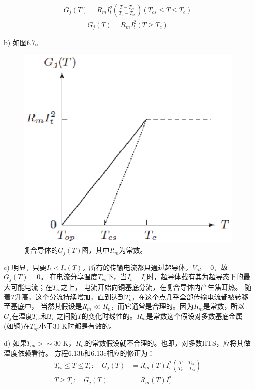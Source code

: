 \begin{align*}
	G_j(T)=R_mI_t^2(\frac{T-T_{cs}}{T_c-T_{cs}}) (T_{cs}\leq T\leq T_c) \tag{6.13b}
\end{align*}
\begin{align*}
    G_j(T)=R_mI_t^2 (T\ge T_c) \tag{6.13c}
\end{align*}


b) 如图6.7。
\begin{figure}[htbp]
	\centering
	\includegraphics[scale=0.6]{chpt6/figs/fig6.7.eps}
	\caption{复合导体的$G_j(T)$图，其中$R_m$为常数。}
\end{figure}

c) 明显，只要$I_t<I_c(T)$，所有的传输电流都只通过超导体，$V_{cd}=0$，故$G_j(T)=0$。
在电流分享温度$T_{cs}$下，当$I_t=I_c$时，超导体载有其为超导态下的最大可能电流；在$T_{cs}$之上，
电流开始向铜基底分流，在复合导体内产生焦耳热。
随着$T$升高，这个分流持续增加，直到达到$T_c$，在这个点几乎全部传输电流都被转移至基底中，
当然其假设是$R_m\ll R_n$，而它通常是合理的。因为$R_m$是常数，所以$G_j$在温度$T_{cs}$和$T_c$
之间随$T$的变化时线性的。$R_m$是常数这个假设对多数基底金属(如铜)在$T_{op}$小于30 K时都是有效的。

d) 如果$T_{op}>\sim 30$ K，$R_m$的常数假设就不合理的。也即，对多数HTS，应将其做温度依赖看待。
方程6.13b和6.13c相应的修正为：
\begin{subequations}
	\begin{align}
	T_{cs}\leq T\leq T_c:\quad G_j(T)&=R_m(T)I_t^2(\frac{T-T_{cs}}{T_c-T_{cs}})\\
	T\ge T_c:\quad G_j(T)&=R_m(T)I_t^2
	\end{align}
\end{subequations}


